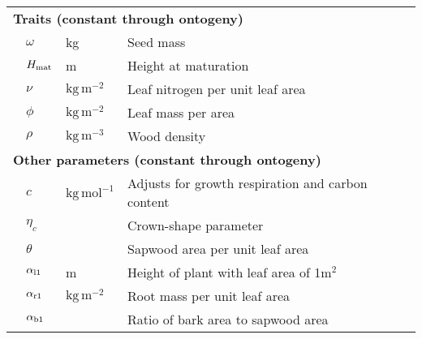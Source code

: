 \documentclass[a4paper,11pt]{article}
\begin{document}
\begin{table}[ht]
{\begin{tabular}{p{0.1cm}p{2cm}p{2.5cm}p{8cm}}
\multicolumn{4}{l}{\textbf{Traits (constant through ontogeny)}} \\
& $\omega$ & kg & Seed mass  \\
& $H_{{\rm mat}}$ & m & Height at maturation\\
& $\nu$ & $\mathrm{kg}\,\mathrm{m}^{-2}$ & Leaf nitrogen per unit leaf area  \\
& $\phi$ & $\mathrm{kg}\,\mathrm{m}^{-2}$ & Leaf mass per area \\
& $\rho$ & $\mathrm{kg}\,\mathrm{m}^{-3}$ & Wood density \\
\multicolumn{4}{l}{\textbf{Other parameters (constant through ontogeny)}} \\
& $c$ & $\mathrm{kg}\,\mathrm{mol}^{-1}$ & Adjusts for growth respiration and carbon content\\
& $\eta_c$ & & Crown-shape parameter\\
& $\theta$ &  & Sapwood area per unit leaf area\\
& $\alpha_{\rm l1}$ & m & Height of plant with leaf area of 1m$^2$ \\
& $\alpha_{\rm r1}$ & $\mathrm{kg}\,\mathrm{m}^{-2}$ & Root mass per unit leaf area \\
& $\alpha_{\rm b1}$ &  & Ratio of bark area to sapwood area\\
\hline
\end{tabular}
}
\label{tab:definitions}
\end{table}



\newpage
\end{document}
